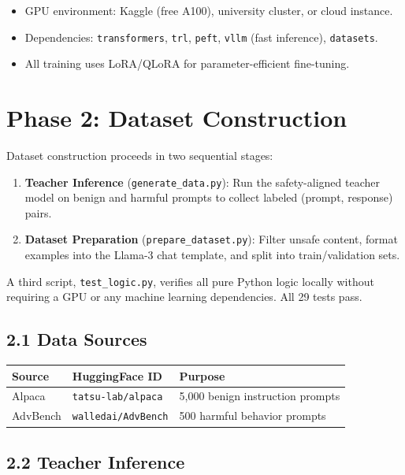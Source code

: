 \documentclass[11pt]{article}
\begin{document}
\begin{itemize}
    \item GPU environment: Kaggle (free A100), university cluster, or cloud instance.
    \item Dependencies: \texttt{transformers}, \texttt{trl}, \texttt{peft}, \texttt{vllm} (fast inference), \texttt{datasets}.
    \item All training uses LoRA/QLoRA for parameter-efficient fine-tuning.
\end{itemize}

\section{Phase 2: Dataset Construction}

Dataset construction proceeds in two sequential stages:

\begin{enumerate}
    \item \textbf{Teacher Inference} (\texttt{generate\_data.py}): Run the safety-aligned teacher model on benign and harmful prompts to collect labeled (prompt, response) pairs.
    \item \textbf{Dataset Preparation} (\texttt{prepare\_dataset.py}): Filter unsafe content, format examples into the Llama-3 chat template, and split into train/validation sets.
\end{enumerate}

A third script, \texttt{test\_logic.py}, verifies all pure Python logic locally without requiring a GPU or any machine learning dependencies. All 29 tests pass.

\subsection{2.1 Data Sources}

\begin{center}
\begin{tabular}{lll}
\toprule
\textbf{Source} & \textbf{HuggingFace ID} & \textbf{Purpose} \\
\midrule
Alpaca   & \texttt{tatsu-lab/alpaca}  & 5{,}000 benign instruction prompts \\
AdvBench & \texttt{walledai/AdvBench} & 500 harmful behavior prompts \\
\bottomrule
\end{tabular}
\end{center}

\subsection{2.2 Teacher Inference}
\end{document}
